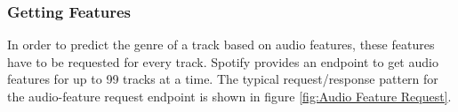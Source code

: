 %

\subsubsection{Getting Features}

In order to predict the genre of a track based on audio features, these features have to be requested
for every track. Spotify provides an endpoint to get audio features for up to 99 tracks at a time.
The typical request/response pattern for the audio-feature request endpoint is shown in figure \ref{fig:Audio Feature Request}.

